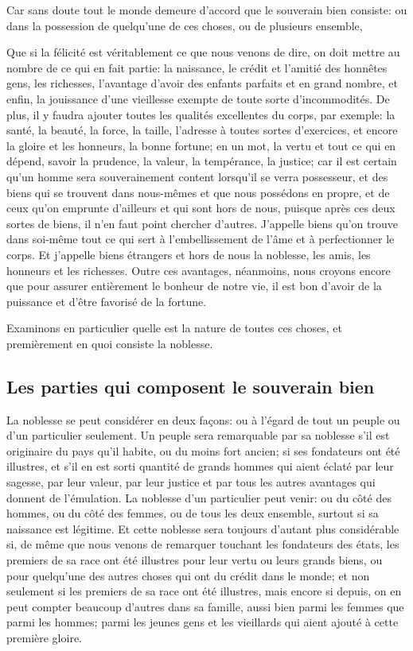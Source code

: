 Car sans doute tout le monde demeure d'accord que le souverain bien consiste: ou dans la possession de quelqu'une
de ces choses, ou de plusieurs ensemble,

Que si la félicité est véritablement ce que nous venons de dire, on doit mettre au nombre de ce qui en fait partie:
la naissance, le crédit et l'amitié des honnêtes gens, les richesses, l'avantage d'avoir des enfants parfaits et en
grand nombre, et enfin, la jouissance d'une vieillesse exempte de toute sorte d'incommodités. De plus, il y faudra
ajouter toutes les qualités excellentes du corps, par exemple: la santé, la beauté, la force, la taille, l'adresse à
toutes sortes d'exercices, et encore la gloire et les honneurs, la bonne fortune; en un mot, la vertu et tout ce qui
en dépend, savoir la prudence, la valeur, la tempérance, la justice; car il est certain qu'un homme sera souverainement
content lorsqu'il se verra possesseur, et des biens qui se trouvent dans nous-mêmes et que nous possédons en propre,
et de ceux qu'on emprunte d'ailleurs et qui sont hors de nous, puisque après ces deux sortes de biens, il n'en faut
point chercher d'autres. J'appelle biens qu'on trouve dans soi-même tout ce qui sert à l'embellissement de l'âme et à
perfectionner le corps. Et j'appelle biens étrangers et hors de nous la noblesse, les amis, les honneurs et les richesses.
Outre ces avantages, néanmoins, nous croyons encore que pour assurer entièrement le bonheur de notre vie, il est bon
d'avoir de la puissance et d'être favorisé de la fortune.

Examinons en particulier quelle est la nature de toutes ces choses, et premièrement en quoi consiste la noblesse.

\subsection{Les parties qui composent le souverain bien}

La noblesse se peut considérer en deux façons: ou à l'égard de tout un peuple ou d'un particulier seulement. Un peuple
sera remarquable par sa noblesse s'il est originaire du pays qu'il habite, ou du moins fort ancien; si ses fondateurs
ont été illustres, et s'il en est sorti quantité de grands hommes qui aient éclaté par leur sagesse, par leur valeur,
par leur justice et par tous les autres avantages qui donnent de l’émulation. La noblesse d'un particulier peut venir:
ou du côté des hommes, ou du côté des femmes, ou de tous les deux ensemble, surtout si sa naissance est légitime. Et
cette noblesse sera toujours d'autant plus considérable si, de même que nous venons de remarquer touchant les fondateurs
des états, les premiers de sa race ont été illustres pour leur vertu ou leurs grands biens, ou pour quelqu'une des autres
choses qui ont du crédit dans le monde; et non seulement si les premiers de sa race ont été illustres, mais encore si depuis,
on en peut compter beaucoup d'autres dans sa famille, aussi bien parmi les femmes que parmi les hommes; parmi les jeunes
gens et les vieillards qui aient ajouté à cette première gloire.


